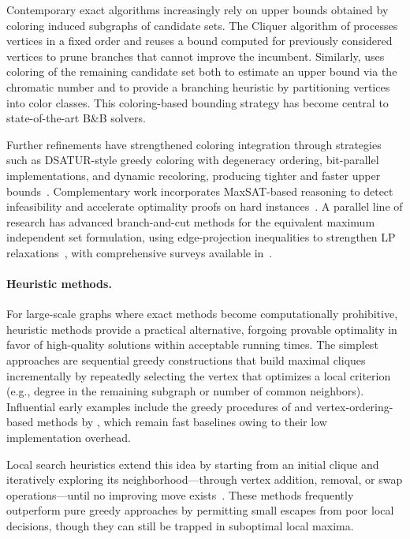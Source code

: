 Contemporary exact algorithms increasingly rely on upper bounds
obtained by coloring induced subgraphs of candidate sets. The Cliquer algorithm of \cite{Ostergard02} processes vertices in a fixed order and reuses a bound computed for previously considered vertices to prune branches that cannot improve the incumbent. Similarly, \cite{TomitaSeki2003} uses
coloring of the remaining candidate set both to estimate an upper bound
via the chromatic number and to provide a branching heuristic by partitioning vertices into color classes. This coloring-based bounding strategy has become central to state-of-the-art B\&B solvers.

Further refinements have strengthened coloring integration through
strategies such as DSATUR-style greedy coloring with degeneracy
ordering, bit-parallel implementations, and dynamic recoloring,
producing tighter and faster upper
bounds~\citep{bourjolly1996, BOURJOLLY199721, Kumlander2005,
TomitaKameda2007, Konc2007AnIB, Tomita2010, SANSEGUNDO2011571}.
Complementary work incorporates MaxSAT-based reasoning to detect
infeasibility and accelerate optimality proofs on hard
instances~\citep{LiQuan2010, WU2015693, Maslov2014}. A parallel line
of research has advanced branch-and-cut methods for the equivalent
maximum independent set formulation, using edge-projection inequalities
to strengthen LP relaxations~\citep{Mannino1996, Rossi2001,
Rebennack2011}, with comprehensive surveys available
in~\cite{Rebennack2012}.

\paragraph{Heuristic methods.}
For large-scale graphs where exact methods become computationally
prohibitive, heuristic methods provide a practical alternative,
forgoing provable optimality in favor of high-quality solutions within
acceptable running times. The simplest approaches are sequential greedy
constructions that build maximal cliques incrementally by repeatedly
selecting the vertex that optimizes a local criterion (e.g., degree in
the remaining subgraph or number of common neighbors). Influential
early examples include the greedy procedures of \cite{johnson1975} and
vertex-ordering-based methods by \cite{tomita1988}, which remain fast
baselines owing to their low implementation overhead.

Local search heuristics extend this idea by starting from an initial
clique and iteratively exploring its neighborhood---through vertex
addition, removal, or swap operations---until no improving move
exists~\citep{foe1994}. These methods frequently outperform pure greedy
approaches by permitting small escapes from poor local decisions,
though they can still be trapped in suboptimal local maxima.

